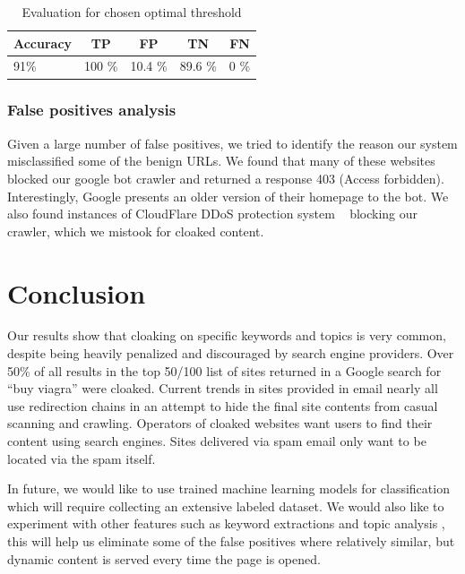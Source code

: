 \documentclass[letterpaper,twocolumn,10pt]{article}
\begin{document}
\begin{table}
\begin{center}
\begin{tabular}{|lcccc|}
\hline
{\bf Accuracy} & {\bf TP} & {\bf FP}  & {\bf TN} & {\bf FN}\\
\hline
91\% & 100 \% & 10.4 \% &  89.6 \% & 0 \%\\
\hline
\end{tabular}
\end{center}
\caption{Evaluation for chosen optimal threshold}\label{tab:eval}
\end{table}

\subsubsection{False positives analysis}
Given a large number of false positives, we tried to identify the reason our system misclassified some of the benign URLs. We found that many of these websites blocked our google bot crawler and returned a response 403 (Access forbidden). Interestingly, Google presents an older version of their homepage to the bot. We also found instances of CloudFlare DDoS protection system ~\cite{cloudflare} blocking our crawler, which we mistook for cloaked content.

\section{Conclusion}

Our results show that cloaking on specific keywords and topics is very common, despite being heavily penalized and discouraged by search engine providers. Over 50\% of all results in the top 50/100 list of sites returned in a Google search for ``buy viagra'' were cloaked. Current trends in sites provided in email nearly all use redirection chains in an attempt to hide the final site contents from casual scanning and crawling.  Operators of cloaked websites want users to find their content using search engines.  Sites delivered via spam email only want to be located via the spam itself.

In future, we would like to use trained machine learning models for classification which will require collecting an extensive labeled dataset. We would also like to experiment with other features such as keyword extractions \cite{Wu:2006:DSC:1135777.1135901} and topic analysis \cite{cloak}, this will help us eliminate some of the false positives where relatively similar, but dynamic content is served every time the page is opened.
{
  \small
  
  
}
\end{document}
